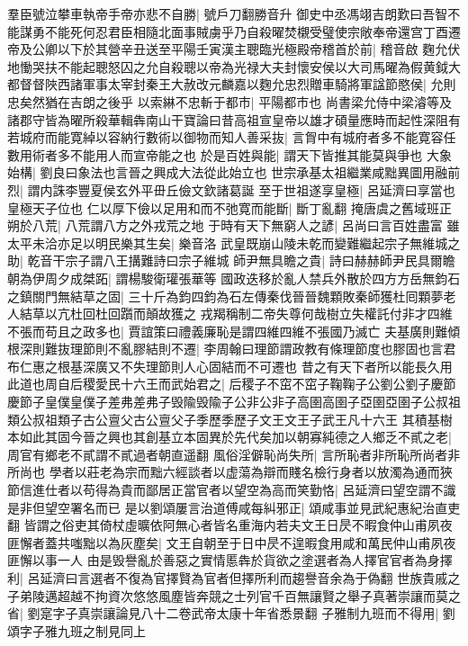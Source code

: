 羣臣號泣攀車執帝手帝亦悲不自勝|{
	號戶刀翻勝音升}
御史中丞馮翊吉朗歎曰吾智不能謀勇不能死何忍君臣相隨北面事賊虜乎乃自殺曜焚櫬受璧使宗敞奉帝還宫丁酉遷帝及公卿以下於其營辛丑送至平陽壬寅漢主聰臨光極殿帝稽首於前|{
	稽音啟}
麴允伏地慟哭扶不能起聰怒囚之允自殺聰以帝為光禄大夫封懷安侯以大司馬曜為假黄鉞大都督督陜西諸軍事太宰封秦王大赦改元麟嘉以麴允忠烈贈車騎將軍諡節愍侯|{
	允則忠矣然猶在吉朗之後乎}
以索綝不忠斬于都市|{
	平陽都市也}
尚書梁允侍中梁濬等及諸郡守皆為曜所殺華輯犇南山干寶論曰昔高祖宣皇帝以雄才碩量應時而起性深阻有若城府而能寛綽以容納行數術以御物而知人善采抜|{
	言胷中有城府者多不能寛容任數用術者多不能用人而宣帝能之也}
於是百姓與能|{
	謂天下皆推其能莫與爭也}
大象始構|{
	劉良曰象法也言晉之興成大法從此始立也}
世宗承基太祖繼業咸黜異圖用融前烈|{
	謂内誅李豐夏侯玄外平毌丘儉文欽諸葛誕}
至于世祖遂享皇極|{
	呂延濟曰享當也皇極天子位也}
仁以厚下儉以足用和而不弛寛而能斷|{
	斷丁亂翻}
掩唐虞之舊域班正朔於八荒|{
	八荒謂八方之外戎荒之地}
于時有天下無窮人之諺|{
	呂尚曰言百姓盡富}
雖太平未洽亦足以明民樂其生矣|{
	樂音洛}
武皇既崩山陵未乾而變難繼起宗子無維城之助|{
	乾音干宗子謂八王搆難詩曰宗子維城}
師尹無具瞻之貴|{
	詩曰赫赫師尹民具爾瞻}
朝為伊周夕成桀跖|{
	謂楊駿衛瓘張華等}
國政迭移於亂人禁兵外散於四方方岳無鈞石之鎮關門無結草之固|{
	三十斤為鈞四鈞為石左傳秦伐晉晉魏顆敗秦師獲杜囘顆夢老人結草以亢杜回杜回躓而顛故獲之}
戎羯稱制二帝失尊何哉樹立失權託付非才四維不張而苟且之政多也|{
	賈誼策曰禮義廉恥是謂四維四維不張國乃滅亡}
夫基廣則難傾根深則難抜理節則不亂膠結則不遷|{
	李周翰曰理節謂政教有條理節度也膠固也言君布仁惠之根基深廣又不失理節則人心固結而不可遷也}
昔之有天下者所以能長久用此道也周自后稷愛民十六王而武始君之|{
	后稷子不窋不窋子鞠鞠子公劉公劉子慶節慶節子皇僕皇僕子差弗差弗子毁隃毁隃子公非公非子高圉高圉子亞圉亞圉子公叔祖類公叔祖類子古公亶父古公亶父子季歷季歷子文王文王子武王凡十六王}
其積基樹本如此其固今晉之興也其創基立本固異於先代矣加以朝寡純德之人鄉乏不貳之老|{
	周官有鄉老不貳謂不貳過者朝直遥翻}
風俗淫僻恥尚失所|{
	言所恥者非所恥所尚者非所尚也}
學者以莊老為宗而黜六經談者以虚蕩為辯而賤名檢行身者以放濁為通而狹節信進仕者以苟得為貴而鄙居正當官者以望空為高而笑勤恪|{
	呂延濟曰望空謂不識是非但望空署名而已}
是以劉頌屢言治道傅咸每糾邪正|{
	頌咸事並見武紀惠紀治直吏翻}
皆謂之俗吏其倚杖虛曠依阿無心者皆名重海内若夫文王日昃不暇食仲山甫夙夜匪懈者蓋共嗤黜以為灰塵矣|{
	文王自朝至于日中昃不遑暇食用咸和萬民仲山甫夙夜匪懈以事一人}
由是毁譽亂於善惡之實情慝犇於貨欲之塗選者為人擇官官者為身擇利|{
	呂延濟曰言選者不復為官擇賢為官者但擇所利而趨譽音余為于偽翻}
世族貴戚之子弟陵邁超越不拘資次悠悠風塵皆奔競之士列官千百無讓賢之舉子真著崇讓而莫之省|{
	劉寔字子真崇讓論見八十二卷武帝太康十年省悉景翻}
子雅制九班而不得用|{
	劉頌字子雅九班之制見同上}
